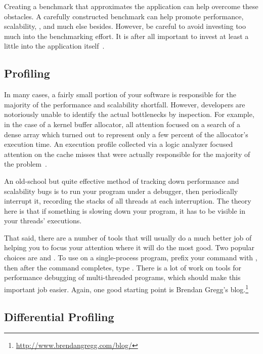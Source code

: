 Creating a benchmark that approximates
the application can help overcome these obstacles.
A carefully constructed benchmark can help promote performance,
scalability, , and much else besides.
However, be careful to avoid investing too much into the benchmarking
effort.
It is after all important to invest at least a little into the
application itself~\cite{Gray91}.

\subsection{Profiling}
\label{sec:debugging:Profiling}

In many cases, a fairly small portion of your software is responsible
for the majority of the performance and scalability shortfall.
However, developers are notoriously unable to identify the actual
bottlenecks by inspection.
For example, in the case of a kernel buffer allocator, all attention focused
on a search of a dense array which turned out to represent only
a few percent of the allocator's execution time.
An execution profile collected via a logic analyzer focused attention
on the cache misses that were actually responsible for the majority
of the problem~\cite{McKenney93}.

An old-school but quite effective method of tracking down performance
and scalability bugs is to run your program under a debugger,
then periodically interrupt it, recording the stacks of all threads
at each interruption.
The theory here is that if something is slowing down your program,
it has to be visible in your threads' executions.

That said, there are a number of tools
that will usually do a much better job of helping you to focus your
attention where it will do the most good.
Two popular choices are  and .
To use  on a single-process program, prefix your command
with , then after the command completes, type
.
There is a lot of work on tools for performance debugging of multi-threaded
programs, which should make this important job easier.
Again, one good starting point is Brendan Gregg's blog.\footnote{
	\url{http://www.brendangregg.com/blog/}}

\subsection{Differential Profiling}
\label{sec:debugging:Differential Profiling}

